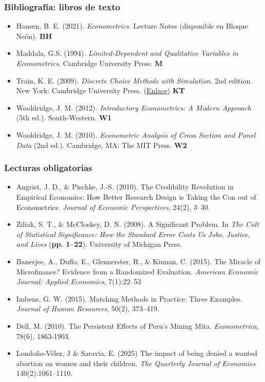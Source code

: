 \documentclass[10pt, xcolor=dvipsnames]{beamer}
\begin{document}
\begin{frame}\frametitle{Bibliografía: libros de texto}
 	\fontvid
\begin{itemize}[itemsep=0.5em, parsep=0pt]   
    \item Hansen, B. E. (2021). \textit{Econometrics}. Lecture Notes (disponible en Bloque Neón). \textbf{BH}  
    \item Maddala, G.S. (1994). \textit{Limited-Dependent and Qualitative Variables in Econometrics}. Cambridge University Press. \textbf{M}   
    \item Train, K. E. (2009). \textit{Discrete Choice Methods with Simulation}. 2nd edition. New York: Cambridge University Press. (\href{https://eml.berkeley.edu/books/choice2.html}{Enlace}) \textbf{KT}      
    \item Wooldridge, J. M. (2012). \textit{Introductory Econometrics: A Modern Approach} (5th ed.). South-Western.  \textbf{W1}
    \item Wooldridge, J. M. (2010). \textit{Econometric Analysis of Cross Section and Panel Data} (2nd ed.). Cambridge, MA: The MIT Press. \textbf{W2}
\end{itemize}
\end{frame}

\begin{frame}\frametitle{Lecturas obligatorias}
\fontvic		
\begin{itemize}
    \item[{\color{blue} $\star$}] Angrist, J. D., \& Pischke, J.-S. (2010). The Credibility Revolution in Empirical Economics: How Better Research Design is Taking the Con out of Econometrics. \textit{Journal of Economic Perspectives}, 24(2), 3–30.
    
    \item[{\color{blue} $\star$}] Ziliak, S. T., \& McCloskey, D. N. (2008). A Significant Problem. In \textit{The Cult of Statistical Significance: How the Standard Error Costs Us Jobs, Justice, and Lives} (\textbf{pp. 1–22}). University of Michigan Press.
    
    \item[{\color{blue} $\star$}] Banerjee, A., Duflo, E., Glennerster, R., \& Kinnan, C. (2015). The Miracle of Microfinance? Evidence from a Randomized Evaluation. \textit{American Economic Journal: Applied Economics}, 7(1):22–53

    \item[{\color{blue}$\star$}] Imbens, G. W. (2015). Matching Methods in Practice: Three Examples. \textit{Journal of Human Resources}, 50(2), 373–419.
    
    \item[{\color{blue}$\star$}] Dell, M. (2010). The Persistent Effects of Peru's Mining Mita. \textit{Econometrica}, 78(6), 1863-1903.   
   
    \item[{\color{blue}$\star$}] Londoño-Vélez, J \& Saravia, E. (2025) The impact of being denied a wanted abortion on women and their children. \textit{The Quarterly Journal of Economics} 140(2):1061–1110.
\end{itemize}	
\end{frame}
\end{document}
